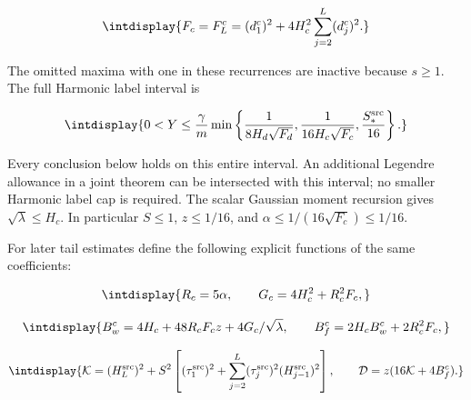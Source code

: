 \begingroup\renewcommand{\theHequation}{intdisplay.148}
\begin{equation}
\intdisplay{
F_c=F_L^c=(d_1^c)^2+4H_c^2\sum_{j=2}^L(d_j^c)^2.
}
\label{int:eq-0055-harmonic-fitting-coefficients}
\end{equation}
\endgroup


The omitted maxima with one in these recurrences are inactive because \(s\ge1\). The full Harmonic label interval is


\begingroup\renewcommand{\theHequation}{intdisplay.149}
\begin{equation}
\intdisplay{
0<Y\le\frac\gamma m
\min\left\{\frac1{8H_d\sqrt{F_d}},
             \frac1{16H_c\sqrt{F_c}},\frac{S_*^{\rm src}}{16}\right\}.
}
\label{int:eq-0056-harmonic-full-label-interval}
\end{equation}
\endgroup


Every conclusion below holds on this entire interval. An additional Legendre allowance in a joint theorem can be intersected with this interval; no smaller Harmonic label cap is required. The scalar Gaussian moment recursion gives \(\sqrt\lambda\le H_c\). In particular \(S\le1\), \(z\le1/16\), and \(\alpha\le1/(16\sqrt{F_c})\le1/16\).



For later tail estimates define the following explicit functions of the same coefficients:


\begingroup\renewcommand{\theHequation}{intdisplay.150}
\begin{equation*}
\intdisplay{
R_c=5\alpha,\qquad G_c=4H_c^2+R_c^2F_c,
}
\end{equation*}
\endgroup

\begingroup\renewcommand{\theHequation}{intdisplay.151}
\begin{equation*}
\intdisplay{
B_w^c=4H_c+48R_cF_cz+4G_c/\sqrt\lambda,\qquad
B_f^c=2H_cB_w^c+2R_c^2F_c,
}
\end{equation*}
\endgroup

\begingroup\renewcommand{\theHequation}{intdisplay.152}
\begin{equation}
\intdisplay{
\mathcal K=(H_L^{\rm src})^2+
 S^2\left[(\tau_1^{\rm src})^2+
 \sum_{j=2}^L(\tau_j^{\rm src})^2(H_{j-1}^{\rm src})^2\right],
\qquad \mathcal D=z(16\mathcal K+4B_f^c).
}
\label{int:eq-0057-harmonic-tail-coefficient}
\end{equation}
\endgroup

